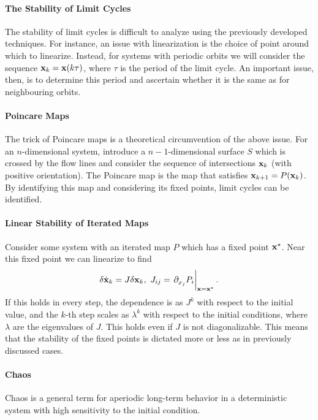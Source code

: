 \paragraph{The Stability of Limit Cycles}
The stability of limit cycles is difficult to analyze using the previously developed techniques. For instance, an issue with linearization is the choice of point around which to linearize. Instead, for systems with periodic orbits we will consider the sequence $\vb{x}_{k} = \vb{x}(k\tau)$, where $\tau$ is the period of the limit cycle. An important issue, then, is to determine this period and ascertain whether it is the same as for neighbouring orbits.

\paragraph{Poincare Maps}
The trick of Poincare maps is a theoretical circumvention of the above issue. For an $n$-dimensional system, introduce a $n - 1$-dimensional surface $S$ which is crossed by the flow lines and consider the sequence of intersections $\vb{x}_{k}$ (with positive orientation). The Poincare map is the map that satisfies $\vb{x}_{k + 1} = P(\vb{x}_{k})$. By identifying this map and considering its fixed points, limit cycles can be identified.

\paragraph{Linear Stability of Iterated Maps}
Consider some system with an iterated map $P$ which has a fixed point $\vb{x}^{\star}$. Near this fixed point we can linearize to find
\begin{align*}
	\delta\dot{\vb{x}}_{k} = J\delta\vb{x}_{k},\ J_{ij} = \eval{\del{}{x_{j}}P_{i}}_{\vb{x} = \vb{x}^{\star}}.
\end{align*}
If this holds in every step, the dependence is as $J^{k}$ with respect to the initial value, and the $k$-th step scales as $\lambda^{k}$ with respect to the initial conditions, where $\lambda$ are the eigenvalues of $J$. This holds even if $J$ is not diagonalizable. This means that the stability of the fixed points is dictated more or less as in previously discussed cases.

\paragraph{Chaos}
Chaos is a general term for aperiodic long-term behavior in a deterministic system with high sensitivity to the initial condition.

